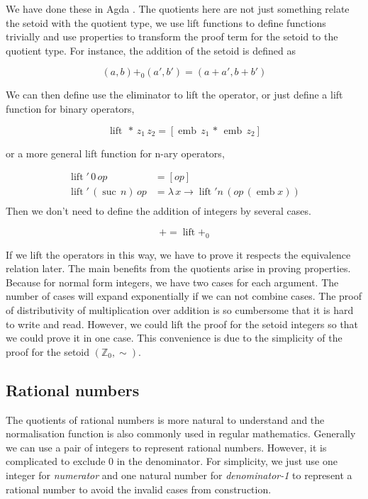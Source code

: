 \documentclass[envcountsame]{llncs}
\newcommand{\Z}{\mathbb{Z}}
\providecommand{\class}[1]{[#1]}
\DeclareMathOperator{\emb}{emb}
\DeclareMathOperator{\lift}{lift}
\DeclareMathOperator{\suc}{suc\,}
\begin{document}
We have done these in Agda \cite{nuo;10}. The quotients here are not just something relate the setoid with the quotient type, we use lift functions to define functions trivially and use properties to transform the proof term for the setoid to the quotient type. For instance, the addition of the setoid is defined as

$$(a,b){+_0}(a', b')= (a+a',b+b')$$

We can then define use the eliminator to lift the operator, or just define a lift function for binary operators,

$$ \lift \,* \,z_1 \,z_2 = \class{\emb \,z_1 \,*\,\emb \,z_2}$$

or a more general lift function for n-ary operators,



\begin{align*}
\lift' \,0 \,op &= \class{op}\\
\lift' \,(\suc n) \,op &= \lambda \,x \to \lift' n \,(op \,(\emb x))\\
\end{align*}
Then we don't need to define the addition of integers by several cases.

$$+ = \lift +_0$$

If we lift the operators in this way, we have to prove it respects the equivalence relation later. The main benefits from the quotients arise in proving properties. Because for normal form integers, we have two cases for each argument. The number of cases will expand exponentially if we can not combine cases. The proof of distributivity of multiplication over addition is so cumbersome
that it is hard to write and read. However, we could lift the proof for the setoid integers so that we could prove it in one case. This convenience is due to the simplicity of the proof for the setoid $(\Z_0,\sim)$. 

\subsection{Rational numbers}

The quotients of rational numbers is more natural to understand and the normalisation function is also commonly used in regular mathematics. Generally we can use a pair of integers to represent rational numbers. However, it is complicated to exclude 0 in the denominator. For simplicity, we just use one integer for \emph{numerator} and one natural number for \emph{denominator-1} to represent a rational number to avoid the invalid cases from construction. 
\end{document}
